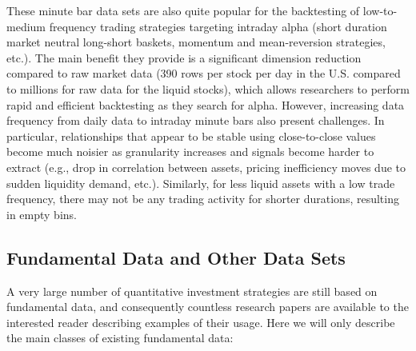 These minute bar data sets are also quite popular for the backtesting of low-to-medium frequency trading strategies targeting intraday alpha (short duration market neutral long-short baskets, momentum and mean-reversion strategies, etc.). The main benefit they provide is a significant dimension reduction compared to raw market data (390 rows per stock per day in the U.S. compared to millions for raw data for the liquid stocks), which allows researchers to perform rapid and efficient backtesting as they search for alpha. However, increasing data frequency from daily data to intraday minute bars also present challenges. In particular, relationships that appear to be stable using close-to-close values become much noisier as granularity increases and signals become harder to extract (e.g., drop in correlation between assets, pricing inefficiency moves due to sudden liquidity demand, etc.). Similarly, for less liquid assets with a low trade frequency, there may not be any trading activity for shorter durations, resulting in empty bins.



\subsection{Fundamental Data and Other Data Sets\label{sec:fund_data_otherdat}}

A very large number of quantitative investment strategies are still based on fundamental data, and consequently countless research papers are available to the interested reader describing examples of their usage. Here we will only describe the main classes of existing fundamental data:


